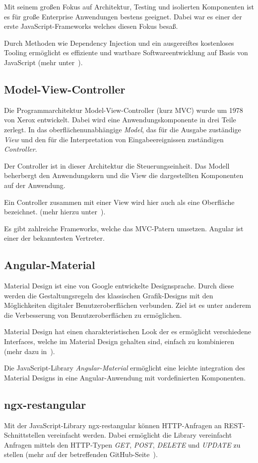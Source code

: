 Mit seinem großen Fokus auf Architektur, Testing und isolierten Komponenten ist es für große Enterprise Anwendungen
bestens geeignet. Dabei war es einer der erste JavaScript-Frameworks welches diesen Fokus besaß.

Durch Methoden wie Dependency Injection und ein ausgereiftes kostenloses Tooling ermöglicht es effiziente und wartbare
Softwareentwicklung auf Basis von JavaScript (mehr unter~\cite{book_grundlagen_angular}).

\subsection{Model-View-Controller}
Die Programmarchitektur Model-View-Controller (kurz MVC) wurde um 1978 von Xerox entwickelt. Dabei wird eine
Anwendungskomponente in drei Teile zerlegt. In das oberflächenunabhängige \textit{Model}, das für die
Ausgabe zuständige \textit{View} und den für die Interpretation von Eingabeereignissen zuständigen \textit{Controller}.

Der Controller ist in dieser Architektur die Steuerungseinheit. Das Modell beherbergt den Anwendungskern und die View
die dargestellten Komponenten auf der Anwendung.

Ein Controller zusammen mit einer View wird hier auch als eine Oberfläche bezeichnet. (mehr hierzu
unter~\cite{book_grundlagen_mvc}).

Es gibt zahlreiche Frameworks, welche das MVC-Patern umsetzen. Angular ist einer der bekanntesten Vertreter.

\subsection{Angular-Material}
Material Design ist eine von Google entwickelte Designsprache. Durch diese werden die Gestaltungsregeln des klassischen
Grafik-Designs mit den Möglichkeiten digitaler Benutzeroberflächen verbunden. Ziel ist es unter anderem die Verbesserung
von Benutzeroberflächen zu ermöglichen.

Material Design hat einen charakteristischen Look der es ermöglicht verschiedene Interfaces, welche im Material Design
gehalten sind, einfach zu kombinieren (mehr dazu in~\cite{online_grundlagen_materialdesign}).

Die JavaScript-Library \textit{Angular-Material} ermöglicht eine leichte integration des Material Designs in eine
Angular-Anwendung mit vordefinierten Komponenten.

\subsection{ngx-restangular}
Mit der JavaScript-Library ngx-restangular können HTTP-Anfragen an REST-Schnitt\-stellen vereinfacht werden. Dabei
ermöglicht die Library vereinfacht Anfragen mittels den HTTP-Typen \textit{GET}, \textit{POST}, \textit{DELETE} und
\textit{UPDATE} zu stellen (mehr auf der betreffenden GitHub-Seite~\cite{online_grundlagen_restangular}).

